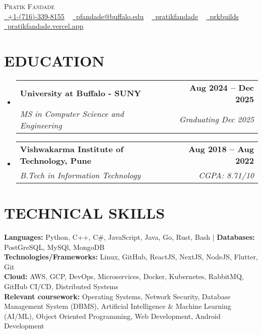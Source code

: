 \documentclass[letterpaper,10pt]{article}
\makeatletter
\newcommand{\resumeSubheading}[4]{
  \vspace{2pt}\item
    \begin{tabular*}{1.0\textwidth}[t]{l@{\extracolsep{\fill}}r}
      \textbf{\large#1} & \textbf{\normalsize #2} \\
      \textit{\large#3} & \textit{\small #4} \\
    \end{tabular*}\vspace{-7pt}
}
\newcommand{\resumeSubHeadingListStart}{\begin{itemize}[leftmargin=0.0in, label={}]}
\newcommand{\resumeSubHeadingListEnd}{\end{itemize}}
\makeatother
\begin{document}
\begin{center}
    {\huge \scshape Pratik Fandade} \\
    \href{tel:+17163398155}{\raisebox{-0.1\height}\faPhone\ \underline{+1-(716)-339-8155}} ~
    \href{mailto:pfandade@buffalo.edu}{\raisebox{-0.2\height}\faEnvelope\ \underline{pfandade@buffalo.edu}} ~ 
    \href{https://linkedin.com/in/pratikfandade}{\raisebox{-0.2\height}\faLinkedinSquare\ \underline{pratikfandade}} ~
    \href{https://github.com/prkbuilds}{\raisebox{-0.2\height}\faGithub\ \underline{prkbuilds}} ~
    \href{https://pratikfandade.vercel.app/}{\raisebox{-0.2\height}\faGlobe\ \underline{pratikfandade.vercel.app}}
\end{center}
\vspace{-10pt}
\section{EDUCATION}
\resumeSubHeadingListStart
    \resumeSubheading {University at Buffalo - SUNY}{Aug 2024 -- Dec 2025}
    {MS in Computer Science and Engineering}{Graduating Dec 2025}
    \resumeSubheading {Vishwakarma Institute of Technology, Pune}{Aug 2018 -- Aug 2022}
    {B.Tech in Information Technology}{CGPA: 8.71/10}
\resumeSubHeadingListEnd
\vspace{-10pt}
\section{TECHNICAL SKILLS}
\begin{itemize}[leftmargin=0.15in, label={}]
    \small{\item{
        \textbf{\normalsize{Languages:}}{ \normalsize{Python, C++, C\#, JavaScript, Java, Go, Rust, Bash}} $|$ \textbf{\normalsize{Databases:}}{ \normalsize{PostGreSQL, MySQl, MongoDB}} \\
        \textbf{\normalsize{Technologies/Frameworks:}}{\normalsize{ Linux, GitHub, ReactJS, NextJS, NodeJS, Flutter, Git }} \\
        \textbf{\normalsize{Cloud:}}{ \normalsize{ AWS, GCP, DevOps, Microservices, Docker, Kubernetes, RabbitMQ, GitHub CI/CD, Distributed Systems }} \\
        \textbf{\normalsize{Relevant coursework:}}{\normalsize{ Operating Systems, Network Security, Database Management System (DBMS), Artificial Intelligence \& Machine Learning (AI/ML), Object Oriented Programming, Web Development, Android Development }} \\
    }}
\end{itemize}
\vspace{-15pt}
\end{document}
